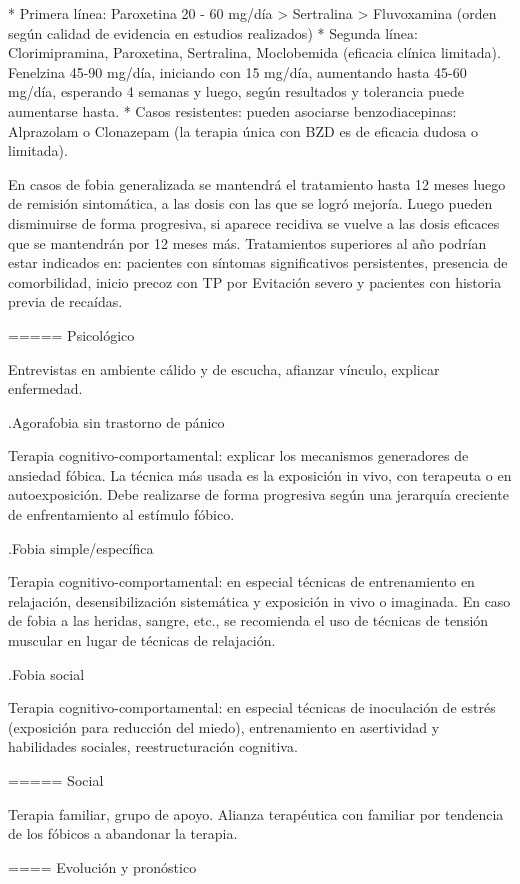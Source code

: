 \begin{itemize}
* Primera línea: Paroxetina 20 - 60 mg/día > Sertralina > Fluvoxamina (orden según calidad de evidencia en estudios realizados)
* Segunda línea: Clorimipramina, Paroxetina, Sertralina, Moclobemida (eficacia clínica limitada). Fenelzina 45-90 mg/día, iniciando con 15 mg/día, aumentando hasta 45-60 mg/día, esperando 4 semanas y luego, según resultados y tolerancia puede aumentarse hasta.
* Casos resistentes: pueden asociarse benzodiacepinas: Alprazolam o Clonazepam (la terapia única con BZD es de eficacia dudosa o limitada).

En casos de fobia generalizada se mantendrá el tratamiento hasta 12 meses luego de remisión sintomática, a las dosis con las que se logró mejoría. Luego pueden disminuirse de forma progresiva, si aparece recidiva se vuelve a las dosis eficaces que se mantendrán por 12 meses más. Tratamientos superiores al año podrían estar indicados en: pacientes con síntomas significativos persistentes, presencia de comorbilidad, inicio precoz con TP por Evitación severo y pacientes con historia previa de recaídas.

===== Psicológico

Entrevistas en ambiente cálido y de escucha, afianzar vínculo, explicar enfermedad.

.Agorafobia sin trastorno de pánico

Terapia cognitivo-comportamental: explicar los mecanismos generadores de ansiedad fóbica. La técnica más usada es la exposición in vivo, con terapeuta o en autoexposición. Debe realizarse de forma progresiva según una jerarquía creciente de enfrentamiento al estímulo fóbico.

.Fobia simple/específica

Terapia cognitivo-comportamental: en especial técnicas de entrenamiento en relajación, desensibilización sistemática y exposición in vivo o imaginada. En caso de fobia a las heridas, sangre, etc., se recomienda el uso de técnicas de tensión muscular en lugar de técnicas de relajación.

.Fobia social

Terapia cognitivo-comportamental: en especial técnicas de inoculación de estrés (exposición para reducción del miedo), entrenamiento en asertividad y habilidades sociales, reestructuración cognitiva.

===== Social

Terapia familiar, grupo de apoyo. Alianza terapéutica con familiar por tendencia de los fóbicos a abandonar la terapia.

==== Evolución y pronóstico


\end{itemize}
